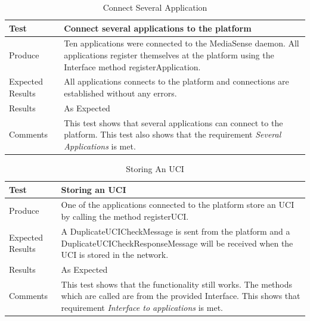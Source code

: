 \begin{table}[!h]
    \begin{tabular}{ | l | p{12cm} |}
    \hline
    Test 	 				& 		 Connect several applications to the platform\\ \hline
	Produce  				& 		 Ten applications were connected to the MediaSense daemon. All applications register themselves at the platform using the Interface method registerApplication.\\ \hline
	Expected Results  		& 		 All applications connects to the platform and connections are established without any errors.\\ \hline
	Results 				& 		 As Expected\\ \hline
	Comments				& 		 This test shows that several applications can connect to the platform. This test also shows that the requirement \emph{Several Applications} is met.\\ \hline
    \end{tabular}
    \caption{Connect Several Application}
\end{table}

\begin{table}[!h]
    \begin{tabular}{ | l | p{12cm} |}
    \hline
    Test 	 				& 		 Storing an UCI\\ \hline
	Produce  				& 		 One of the applications connected to the platform store an UCI by calling the method registerUCI.\\ \hline
	Expected Results  		& 		 A DuplicateUCICheckMessage is sent from the platform and a DuplicateUCICheckResponseMessage will be received when the UCI is stored in the network.\\ \hline
	Results 				& 		 As Expected\\ \hline
	Comments				& 		 This test shows that the functionality still works. The methods which are called are from the provided Interface. This shows that requirement \emph{Interface to applications} is met.\\ \hline
    \end{tabular}
    \caption{Storing An UCI}
\end{table}


